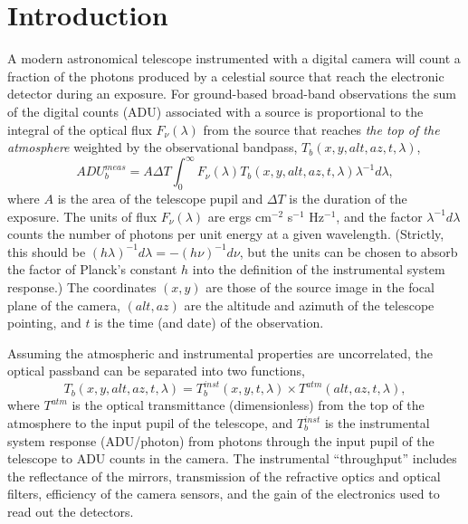 \documentclass[manuscript]{aastex}
\begin{document}


\newpage
\section{ Introduction  }
\label{Sec:intro}
 
A modern astronomical telescope instrumented with a digital camera will count a fraction of the photons produced by a
celestial source that reach the electronic detector during an exposure.
For ground-based broad-band observations the sum of the digital counts (ADU) associated with a source
is proportional to the integral of the optical flux $F_\nu(\lambda)$ from the
source that reaches {\it the top of the atmosphere} weighted by the observational bandpass, $T_b(x,y,alt,az,t,\lambda)$,
\begin{equation}
\label{eqn:cnts}
             ADU_b^{meas} = A \Delta T \int_0^\infty {F_\nu(\lambda) T_b(x,y,alt,az,t,\lambda) \lambda^{-1} d\lambda},
\end{equation}
where $A$ is the area of the telescope pupil and $\Delta T$ is the duration of the exposure.
The units of flux $F_{\nu}(\lambda)$ are ergs cm$^{-2}$ s$^{-1}$ Hz$^{-1}$,
and the factor $\lambda^{-1}d\lambda$ counts the number of photons per unit energy at a given wavelength.
(Strictly, this should be $(h\lambda)^{-1}d\lambda = - (h\nu)^{-1}d\nu$, but the units can be chosen to absorb
the factor of Planck's constant $h$ into the definition of the instrumental system response.)
The coordinates $(x,y)$ are those of the source image in the focal plane of the camera,
$(alt,az)$ are the altitude and azimuth of the telescope pointing,
and $t$ is the time (and date) of the observation. 

Assuming the atmospheric and instrumental properties are uncorrelated, the optical passband can be separated into two functions,  
\begin{equation}
\label{eqn:optb}
         T_b(x,y,alt,az,t,\lambda) = T_b^{inst}(x,y,t,\lambda) \times T^{atm}(alt,az,t,\lambda),
\end{equation}
where $T^{atm}$ is the optical transmittance (dimensionless) from the top of the atmosphere to the input pupil of the telescope,
and $T_b^{inst}$ is the instrumental system response (ADU/photon) from photons through the input pupil of the telescope to ADU counts in the camera.
The instrumental ``throughput'' includes the reflectance of the mirrors, transmission of the refractive optics and optical filters, efficiency 
of the camera sensors, and the gain of the electronics used to read out the detectors. 
\end{document}
